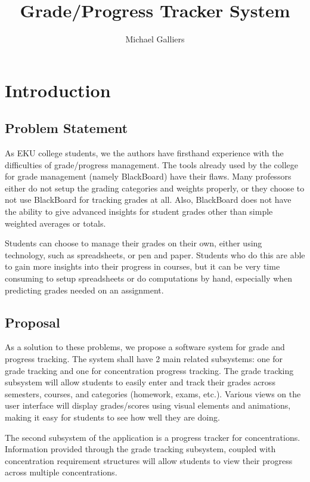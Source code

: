 \documentclass[12pt]{article}
\author{Michael Galliers}
\title{Grade/Progress Tracker System}
\begin{document}
\begin{titlepage}
\maketitle
\end{titlepage}

\newpage
    \tableofcontents
\newpage

\thispagestyle{empty}
\listoffigures
\newpage

\section{Introduction}
\subsection{Problem Statement}
As EKU college students, we the authors have firsthand experience with the difficulties of
grade/progress management. The tools already used by the college for grade management (namely
BlackBoard) have their flaws. Many professors either do not setup the grading categories and weights
properly, or they choose to not use BlackBoard for tracking grades at all. Also, BlackBoard does not
have the ability to give advanced insights for student grades other than simple weighted averages or
totals.

Students can choose to manage their grades on their own, either using technology, such as
spreadsheets, or pen and paper. Students who do this are able to gain more insights into their
progress in courses, but it can be very time consuming to setup spreadsheets or do computations by
hand, especially when predicting grades needed on an assignment.

\subsection{Proposal}
As a solution to these problems, we propose a software system for grade and progress tracking. The
system shall have 2 main related subsystems: one for grade tracking and one for concentration
progress tracking. The grade tracking subsystem will allow students to easily enter and track their
grades across semesters, courses, and categories (homework, exams, etc.). Various views on the user
interface will display grades/scores using visual elements and animations, making it easy for
students to see how well they are doing.

The second subsystem of the application is a progress tracker for concentrations. Information
provided through the grade tracking subsystem, coupled with concentration requirement structures
will allow students to view their progress across multiple concentrations.
\end{document}
